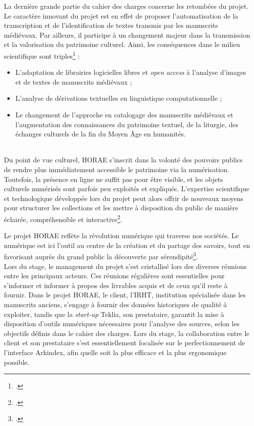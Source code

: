 \documentclass[a4paper,12pt,twoside]{book}
\begin{document}
	    La dernière grande partie du cahier des charges concerne les retombées du projet. Le caractère innovant du projet est en effet de proposer l'automatisation de la transcription et de l'identification de textes transmis par les manuscrits médiévaux. Par ailleurs, il participe à un changement majeur dans la transmission et la valorisation du patrimoine culturel. Ainsi, les conséquences dans le milieu scientifique sont triples\footcite[p. 17-18]{HORAE_projet} : 
	    \begin{itemize}
	        \item L'adaptation de librairies logicielles libres et \textit{open access} à l'analyse d'images et de textes de manuscrits médiévaux ;
	        \item L'analyse de dérivations textuelles en linguistique computationnelle ;
	        \item Le changement de l'approche en catalogage des manuscrits médiévaux et l'augmentation des connaissances du patrimoine textuel, de la liturgie, des échanges culturels de la fin du Moyen Âge en humanités. 
	    \end{itemize}\\
	    
	    Du point de vue culturel, HORAE s'inscrit dans la volonté des pouvoirs publics de rendre plus immédiatement accessible le patrimoine via la numérisation. Toutefois, la présence en ligne ne suffit pas pour être visible, et les objets culturels numérisés sont parfois peu exploités et expliqués. L'expertise scientifique et technologique développée lors du projet peut alors offrir de nouveaux moyens pour structurer les collections et les mettre à disposition du public de manière éclairée, compréhensible et interactive\footcite[p. 18]{HORAE_projet}.  
	    
	    Le projet HORAE reflète la \og révolution numérique\fg{} qui traverse nos sociétés. Le numérique est ici l'outil au centre de la création et du partage des savoirs, tout en favorisant auprès du grand public la découverte par sérendipité\footcite[p. 18-19]{HORAE_projet}. \\
	    
	    Lors du stage, le management du projet s'est cristallisé lors des diverses réunions entre les principaux acteurs. Ces réunions régulières sont essentielles pour s'informer et informer à propos des livrables acquis et de ceux qu'il reste à fournir. Dans le projet HORAE, le client, l'IRHT, institution spécialisée dans les manuscrits anciens, s'engage à fournir des données historiques de qualité à exploiter, tandis que la \textit{start-up} Teklia, son prestataire, garantit la mise à disposition d'outils numériques nécessaires pour l'analyse des sources, selon les objectifs définis dans le cahier des charges. Lors du stage, la collaboration entre le client et son prestataire s'est essentiellement focalisée sur le perfectionnement de l'interface Arkindex, afin quelle soit la plus efficace et la plus ergonomique possible. 
\end{document}
